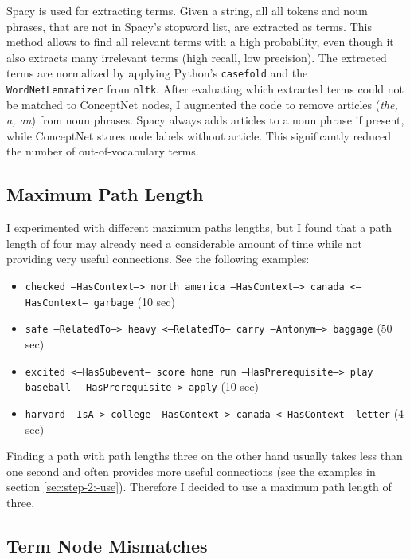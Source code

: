 \documentclass{article}
\begin{document}
Spacy is used for extracting terms. Given a string, all all tokens and
noun phrases, that are not in Spacy's stopword list, are extracted as
terms. This method allows to find all relevant terms with a high
probability, even though it also extracts many irrelevant terms (high
recall, low precision).  The extracted terms are normalized by
applying Python's \verb|casefold| and the \verb`WordNetLemmatizer`
from \verb`nltk`.  After evaluating which extracted terms could
not be matched to ConceptNet nodes, I augmented the code to remove
articles (\emph{the, a, an}) from noun phrases. Spacy always adds
articles to a noun phrase if present, while ConceptNet stores node
labels without article. This significantly reduced the number of
out-of-vocabulary terms.  

\subsection*{Maximum Path Length}
\label{sec:maximum-path-length}

I experimented with different maximum paths lengths, but I found that
a path length of four may already need a considerable amount of time
while not providing very useful connections. See the following examples:

\begin{itemize}
\item \texttt{checked --HasContext--> north america --HasContext-->
    canada <--HasContext-- \newline garbage} (10 sec)
\item \texttt{safe --RelatedTo--> heavy <--RelatedTo-- carry
    --Antonym--> baggage} (50 sec)
\item \texttt{excited <--HasSubevent-- score home run
    --HasPrerequisite--> play baseball } \newline \texttt{--HasPrerequisite--> apply} (10
  sec)
\item \texttt{harvard --IsA--> college --HasContext--> canada
    <--HasContext-- letter} (4 sec)
\end{itemize}

Finding a path with path lengths three on the other hand usually takes
less than one second and often provides more useful connections (see the
examples in section \ref{sec:step-2:-use}). Therefore I decided to use
a maximum path length of three.





\subsection*{Term Node Mismatches}
\label{sec:evaluate-term-node}
\end{document}
